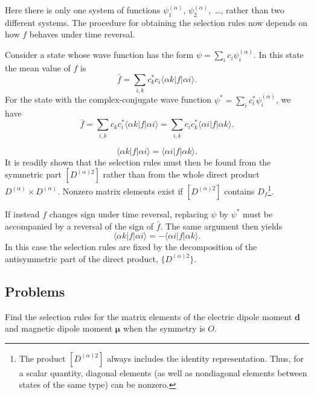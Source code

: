 
Here there is only one system of functions
$\psi_1^{(\alpha)}$, $\psi_2^{(\alpha)}$,~\ldots, rather than two different
systems. The procedure for obtaining the selection rules now depends on how
$f$ behaves under time reversal.

Consider a state whose wave function has the form
$\psi=\sum_i c_i\psi_i^{(\alpha)}$. In this state the mean value of $f$ is
\[
 \bar f=\sum_{i,k}c_k^*c_i\langle\alpha k|f|\alpha i\rangle.
\]
For the state with the complex-conjugate wave function
$\psi^*=\sum_i c_i^*\psi_i^{(\alpha)}$, we have
\[
 \bar f=\sum_{i,k}c_kc_i^*\langle\alpha k|f|\alpha i\rangle
 =\sum_{i,k}c_ic_k^*\langle\alpha i|f|\alpha k\rangle.
\]

\[
 \langle\alpha k|f|\alpha i\rangle=\langle\alpha i|f|\alpha k\rangle.
\]
It is readily shown that the selection rules must then be found from the
symmetric part $[D^{(\alpha)2}]$ rather than from the whole direct product
$D^{(\alpha)}\times D^{(\alpha)}$. Nonzero matrix elements exist if
$[D^{(\alpha)2}]$ contains $D_f$\footnote{The product
$[D^{(\alpha)2}]$ always includes the identity representation. Thus, for a
scalar quantity, diagonal elements (as well as nondiagonal elements between
states of the same type) can be nonzero.}.

If instead $f$ changes sign under time reversal, replacing $\psi$ by $\psi^*$
must be accompanied by a reversal of the sign of $\bar f$. The same argument
then yields
\[
 \langle\alpha k|f|\alpha i\rangle=-\langle\alpha i|f|\alpha k\rangle.
\]
In this case the selection rules are fixed by the decomposition of the
antisymmetric part of the direct product, $\{D^{(\alpha)2}\}$.

\subsection*{Problems}

 Find the selection rules for the matrix elements of the
electric dipole moment $\mathbf d$ and magnetic dipole moment
$\boldsymbol\mu$ when the symmetry is $O$.

